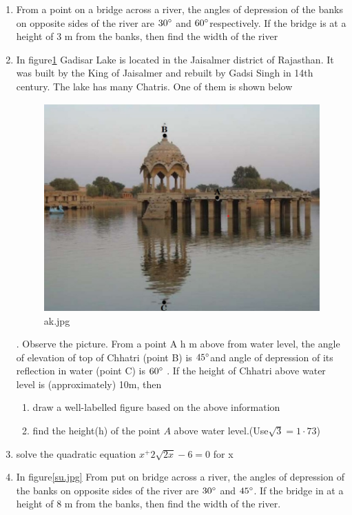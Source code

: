 \documentclass{article}
\begin{document}
\begin{enumerate}
                 \item From a point on a bridge across a river, the angles of depression of the banks on opposite sides of the river are $30\degree$ and $60\degree$respectively. If the bridge is at a height of 3 m from the banks, then find the width of the river 
                 \item In figure\ref{ak.jpg} Gadisar Lake is located in the Jaisalmer district of Rajasthan. It was built by the King of Jaisalmer and rebuilt by Gadsi Singh in 14th century. The lake has many Chatris. One of them is shown below
\begin{figure}[htbp]
\centering
\includegraphics[width=\columnwidth]{figs/ak.jpg}
\caption{ak.jpg}
\label{ak.jpg}
\end{figure}.
Observe the picture. From a point A h m above from water level, the 
angle of elevation of top of Chhatri (point B) is $45\degree$and angle of 
depression of its reflection in water (point C) is $60\degree$ . If the height of 
Chhatri above water level is (approximately) 10m, then 
\begin{enumerate}
\item draw a well-labelled figure based on the above information
\item find the height(h) of the point $A$ above water level.(Use$\sqrt{3}=1·73$) 
\end{enumerate}
       \item solve the quadratic equation 
       $x^+2\sqrt{2x}-6=0$ for x
       \item In figure\ref{su.jpg} From put on bridge across a river, the angles of depression of the banks on opposite sides of the river are $30\degree$ and $45\degree$. If the bridge in at a height of 8 m from the banks, then find the width of the river.

\end{enumerate}
\end{document}
